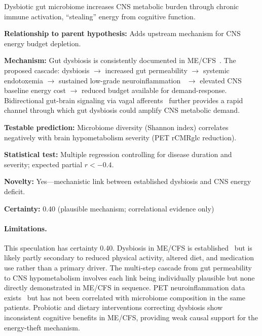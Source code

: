 \begin{speculation}
\label{spec:gut-brain-theft}
Dysbiotic gut microbiome increases CNS metabolic burden through chronic immune activation, ``stealing'' energy from cognitive function.

\textbf{Relationship to parent hypothesis:} Adds upstream mechanism for CNS energy budget depletion.

\textbf{Mechanism:} Gut dysbiosis is consistently documented in ME/CFS~\cite{Hsu2025gut}. The proposed cascade: dysbiosis $\to$ increased gut permeability $\to$ systemic endotoxemia $\to$ sustained low-grade neuroinflammation~\cite{Nakatomi2014neuroinflammation} $\to$ elevated CNS baseline energy cost $\to$ reduced budget available for demand-response. Bidirectional gut-brain signaling via vagal afferents~\cite{Kaelberer2018} further provides a rapid channel through which gut dysbiosis could amplify CNS metabolic demand.

\textbf{Testable prediction:} Microbiome diversity (Shannon index) correlates negatively with brain hypometabolism severity (PET rCMRglc reduction).

\textbf{Statistical test:} Multiple regression controlling for disease duration and severity; expected partial $r < -0.4$.

\textbf{Novelty:} Yes---mechanistic link between established dysbiosis and CNS energy deficit.

\textbf{Certainty:} 0.40 (plausible mechanism; correlational evidence only)

\paragraph{Limitations.}
This speculation has certainty 0.40. Dysbiosis in ME/CFS is established~\cite{Hsu2025gut} but is likely partly secondary to reduced physical activity, altered diet, and medication use rather than a primary driver. The multi-step cascade from gut permeability to CNS hypometabolism involves each link being individually plausible but none directly demonstrated in ME/CFS in sequence. PET neuroinflammation data exists~\cite{Nakatomi2014neuroinflammation} but has not been correlated with microbiome composition in the same patients. Probiotic and dietary interventions correcting dysbiosis show inconsistent cognitive benefits in ME/CFS, providing weak causal support for the energy-theft mechanism.
\end{speculation}

